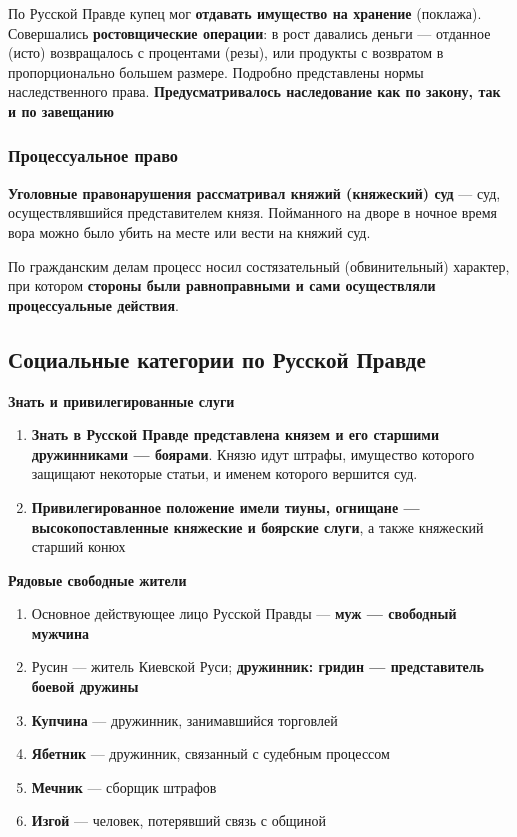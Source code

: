\documentclass{article}
\begin{document}
По Русской Правде купец мог \textbf{отдавать имущество на хранение} (поклажа). Совершались \textbf{ростовщические операции}: в рост давались деньги — отданное (исто) возвращалось с процентами (резы), или продукты с возвратом в пропорционально большем размере. Подробно представлены нормы наследственного права. \textbf{Предусматривалось наследование как по закону, так и по завещанию}

\subsubsection{Процессуальное право}

\textbf{Уголовные правонарушения рассматривал княжий (княжеский) суд} — суд, осуществлявшийся представителем князя. Пойманного на дворе в ночное время вора можно было убить на месте или вести на княжий суд.

По гражданским делам процесс носил состязательный (обвинительный) характер, при котором \textbf{стороны были равноправными и сами осуществляли процессуальные действия}.

\subsection{Социальные категории по Русской Правде}

\textbf{Знать и привилегированные слуги}

\begin{enumerate}
    \item \textbf{Знать в Русской Правде представлена князем и его старшими дружинниками — боярами}. Князю идут штрафы, имущество которого защищают некоторые статьи, и именем которого вершится суд.
    \item \textbf{Привилегированное положение имели тиуны, огнищане — высокопоставленные княжеские и боярские слуги}, а также княжеский старший конюх
\end{enumerate}

\hfill

\textbf{Рядовые свободные жители}

\begin{enumerate}
    \item Основное действующее лицо Русской Правды — \textbf{муж — свободный мужчина}
    \item Русин — житель Киевской Руси; \textbf{дружинник: гридин — представитель боевой дружины}
    \item \textbf{Купчина} — дружинник, занимавшийся торговлей
    \item \textbf{Ябетник} — дружинник, связанный с судебным процессом
    \item \textbf{Мечник} — сборщик штрафов
    \item \textbf{Изгой} — человек, потерявший связь с общиной
\end{enumerate}
\end{document}

